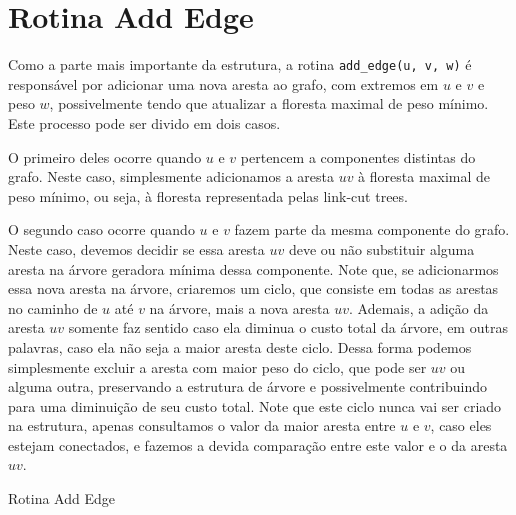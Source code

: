 \section{Rotina Add Edge}
\label{sec:imsf-add-edge}

Como a parte mais importante da estrutura, a rotina \texttt{add\_edge(u, v, w)} é responsável por adicionar uma nova aresta ao grafo, com extremos em $u$ e $v$ e peso $w$, possivelmente tendo que atualizar a floresta maximal de peso mínimo. Este processo pode ser divido em dois casos.

O primeiro deles ocorre quando $u$ e $v$ pertencem a componentes distintas do grafo. Neste caso, simplesmente adicionamos a aresta $uv$ à floresta maximal de peso mínimo, ou seja, à floresta representada pelas link-cut trees.

O segundo caso ocorre quando $u$ e $v$ fazem parte da mesma componente do grafo. Neste caso, devemos decidir se essa aresta $uv$ deve ou não substituir alguma aresta na árvore geradora mínima dessa componente. Note que, se adicionarmos essa nova aresta na árvore, criaremos um ciclo, que consiste em todas as arestas no caminho de $u$ até $v$ na árvore, mais a nova aresta $uv$. Ademais, a adição da aresta $uv$ somente faz sentido caso ela diminua o custo total da árvore, em outras palavras, caso ela não seja a maior aresta deste ciclo. Dessa forma podemos simplesmente excluir a aresta com maior peso do ciclo, que pode ser $uv$ ou alguma outra, preservando a estrutura de árvore e possivelmente contribuindo para uma diminuição de seu custo total. Note que este ciclo nunca vai ser criado na estrutura, apenas consultamos o valor da maior aresta entre $u$ e $v$, caso eles estejam conectados, e fazemos a devida comparação entre este valor e o da aresta $uv$.

\begin{algorithm}[h!]
    \caption{Rotina Add Edge}\label{imsf-add-edge}
    \begin{algorithmic}[1]
        \EndIf
        \EndFunction
    \end{algorithmic}
\end{algorithm}

